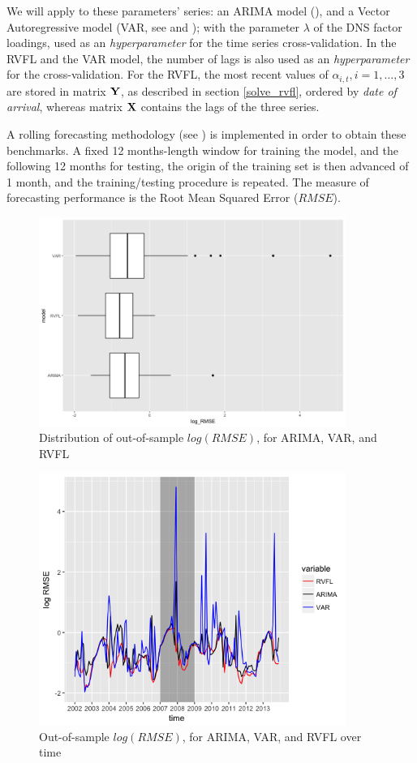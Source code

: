 \medskip

We will apply to these parameters' series: an ARIMA model (\cite{hyndman2008automatic}), and a Vector Autoregressive model (VAR, see \cite{pfaff2008var} and \cite{lutkepohl2005new}); with the parameter $\lambda$ of the DNS factor loadings, used as an \textit{hyperparameter} for the time series cross-validation. In the RVFL and the VAR model, the number of lags is also used as an \textit{hyperparameter} for the cross-validation. For the RVFL, the most recent values of $\alpha_{i, t}, i = 1, \ldots, 3$ are stored in matrix ${\bf Y}$, as described in section \ref{solve_rvfl}, ordered by \textit{date of arrival}, whereas matrix ${\bf X}$ contains the lags of the three series.

\medskip

A rolling forecasting methodology (see \cite{bergmeir2015note}) is implemented in order to obtain these benchmarks. A fixed 12 months-length window for training the model, and the following 12 months for testing, the origin of the training set is then advanced of 1 month, and the training/testing procedure is repeated. The measure of forecasting performance is the Root Mean Squared Error ($RMSE$).

\begin{figure}[!htb]
\centering
\includegraphics[width=10cm]{gfx/chapter-rvfl-mts/boxplot.png}
\caption{Distribution of out-of-sample $log(RMSE)$, for ARIMA, VAR, and RVFL}
\label{error_dist}
\end{figure}

\begin{figure}[!htb]
\centering
\includegraphics[width=10cm]{gfx/chapter-rvfl-mts/log_RMSE.png}
\caption{Out-of-sample $log(RMSE)$, for ARIMA, VAR, and RVFL over time}
\label{log_RMSE}
\end{figure}

